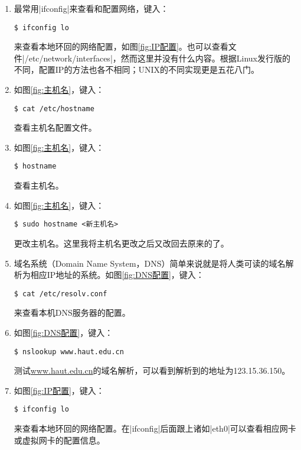 \documentclass[cs4size,a4paper,nofonts]{ctexart}
\begin{document}
\begin{enumerate}

\item 最常用|ifconfig|来查看和配置网络，键入：
\begin{Verbatim}
$ ifconfig lo
\end{Verbatim}
来查看本地环回的网络配置，如图\ref{fig:IP配置}。也可以查看文件|/etc/network/interfaces|，然而这里并没有什么内容。根据Linux发行版的不同，配置IP的方法也各不相同；UNIX的不同实现更是五花八门。

\begin{figure}[htp]
\end{figure}

\item 如图\ref{fig:主机名}，键入：
\begin{Verbatim}
$ cat /etc/hostname
\end{Verbatim}
查看主机名配置文件。

\begin{figure}[htp]
\end{figure}

\item 如图\ref{fig:主机名}，键入：
\begin{Verbatim}
$ hostname
\end{Verbatim}
查看主机名。

\item 如图\ref{fig:主机名}，键入：
\begin{Verbatim}
$ sudo hostname <新主机名>
\end{Verbatim}
更改主机名。这里我将主机名更改之后又改回去原来的了。

\item 域名系统（Domain Name System，DNS）简单来说就是将人类可读的域名解析为相应IP地址的系统。如图\ref{fig:DNS配置}，键入：
\begin{Verbatim}
$ cat /etc/resolv.conf
\end{Verbatim}
来查看本机DNS服务器的配置。

\begin{figure}[htp]
\end{figure}

\item 如图\ref{fig:DNS配置}，键入：
\begin{Verbatim}
$ nslookup www.haut.edu.cn
\end{Verbatim}
测试\url{www.haut.edu.cn}的域名解析，可以看到解析到的地址为123.15.36.150。 

\item 如图\ref{fig:IP配置}，键入：
\begin{Verbatim}
$ ifconfig lo
\end{Verbatim}
来查看本地环回的网络配置。在|ifconfig|后面跟上诸如|eth0|可以查看相应网卡或虚拟网卡的配置信息。


\end{enumerate}
\end{document}
